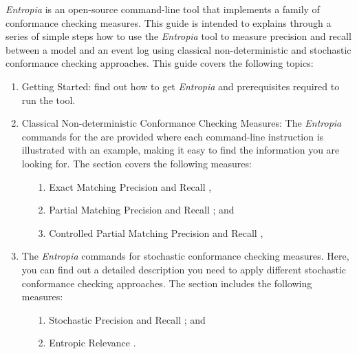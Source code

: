 \textit{Entropia} is an open-source command-line tool that implements a family of conformance checking measures. This guide is intended to explains through a series of simple steps how to use the \textit{Entropia} tool to measure precision and recall between a model and an event log using classical non-deterministic and stochastic conformance checking approaches. This guide covers the following topics:

\begin{enumerate}
\itemsep0em 
\item Getting Started: find out how to get \textit{Entropia} and prerequisites required to run the tool.  
\item Classical Non-deterministic Conformance Checking Measures: The \textit{Entropia} commands for the are provided where each command-line instruction is illustrated with an example, making it easy to find the information you are looking for. The section covers the following measures: 
\begin{enumerate}
\itemsep0em 
\item[1.] Exact Matching Precision and Recall \cite{Polyvyanyy2020TOSEM}, 
\item[2.] Partial Matching Precision and Recall \cite{PolyvyanyyK2019}; and
\item[3.] Controlled Partial Matching Precision and Recall \cite{KalenkovaP2020},
\end{enumerate}
\item The \textit{Entropia} commands for stochastic conformance checking measures. Here, you can find out a detailed description you need to apply different stochastic conformance checking approaches. The section includes the following measures: 
\begin{enumerate}
\item[1.] Stochastic Precision and Recall  \cite{Leemans2020}; and
\item[2.] Entropic Relevance \cite{abs-2007-09310}. 
\end{enumerate}
\end{enumerate}
